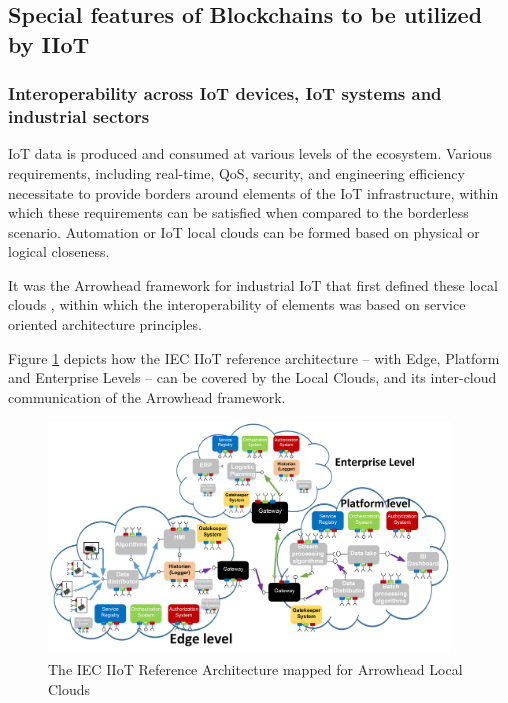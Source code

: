 \documentclass[a4paper]{article}
\begin{document}
\subsection{Special features of Blockchains to be utilized by IIoT}

\subsubsection{Interoperability across IoT devices, IoT systems and industrial sectors}

IoT data is produced and consumed at various levels of the ecosystem. Various requirements, including real-time, QoS, security, and engineering efficiency necessitate to provide borders around elements of the IoT infrastructure, within which these requirements can be satisfied when compared to the borderless scenario. Automation or IoT local clouds can be formed based on physical or logical closeness. 

It was the Arrowhead framework for industrial IoT that first defined these local clouds \cite{Arrowhead_Interoperability}, within which the interoperability of elements was based on service oriented architecture principles.

Figure \ref{fig:IIoT_intercloud} depicts how the IEC IIoT reference architecture -- with Edge, Platform and Enterprise Levels -- can be covered by the Local Clouds, and its inter-cloud communication of the Arrowhead framework.

\begin{figure}[H]
    \centering
    \includegraphics[width=0.95\textwidth]{figures/Arrowhead-IIoT.png}
    \caption{The IEC IIoT Reference Architecture mapped for Arrowhead Local Clouds \cite{IIoT_intercloud}}
    \label{fig:IIoT_intercloud}
\end{figure}
\end{document}
